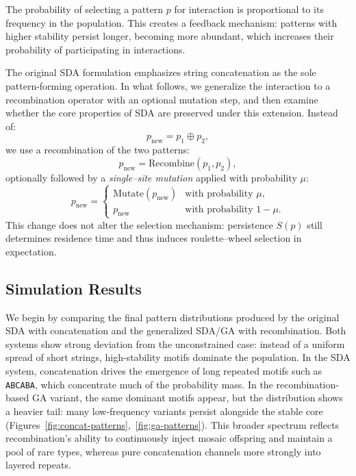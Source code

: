 \documentclass[life,article,submit,pdftex,moreauthors]{Definitions/mdpi}
\begin{document}
The probability of selecting a pattern $p$ for interaction is proportional to its frequency in the population. This creates a feedback mechanism: patterns with higher stability persist longer, becoming more abundant, which increases their probability of participating in interactions.

The original SDA formulation emphasizes string concatenation as the sole pattern-forming operation. In what follows, we generalize the interaction to a recombination operator with an optional mutation step, and then examine whether the core properties of SDA are preserved under this extension. Instead of:
\[
p_{\text{new}} = p_1 \oplus p_2,
\]
we use a recombination of the two patterns:
\[
p_{\text{new}} = \mathrm{Recombine}(p_1,p_2),
\]
optionally followed by a \emph{single–site mutation} applied with probability $\mu$:
\[
p_{\text{new}} =
\begin{cases}
\mathrm{Mutate}(p_{\text{new}}) & \text{with probability } \mu,\\
p_{\text{new}} & \text{with probability } 1-\mu.
\end{cases}
\]
This change does not alter the selection mechanism: persistence 
$S(p)$ still determines
residence time and thus induces roulette–wheel selection in expectation.

\subsection{Simulation Results}

We begin by comparing the final pattern distributions produced by the original SDA with concatenation and the generalized SDA/GA with recombination. Both systems show strong deviation from the unconstrained case: instead of a uniform spread of short strings, high-stability motifs dominate the population. In the SDA system, concatenation drives the emergence of long repeated motifs such as \texttt{ABCABA}, which concentrate much of the probability mass. In the recombination-based GA variant, the same dominant motifs appear, but the distribution shows a heavier tail: many low-frequency variants persist alongside the stable core (Figures~\ref{fig:concat-patterns},~\ref{fig:ga-patterns}). This broader spectrum reflects recombination’s ability to continuously inject mosaic offspring and maintain a pool of rare types, whereas pure concatenation channels more strongly into layered repeats.
\end{document}
